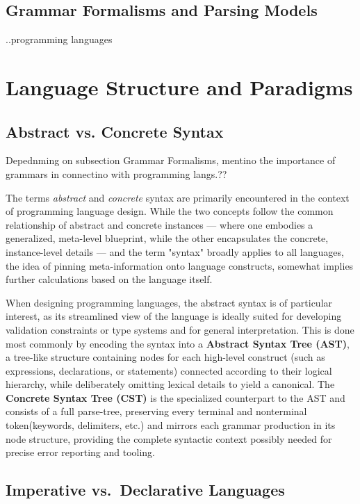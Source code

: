 \documentclass[11pt]{report}
\begin{document}
\subsection{Grammar Formalisms and Parsing Models}
..programming languages

\section{Language Structure and Paradigms}
\subsection{Abstract vs. Concrete Syntax}
Depednming on subsection Grammar Formalisms, mentino the importance of grammars in connectino with programming langs.??

The terms \textit{abstract} and \textit{concrete} syntax are primarily encountered in the context of programming language design. While the two concepts follow the common relationship of
abstract and concrete instances — where one embodies a generalized, meta-level blueprint, while the other encapsulates the concrete, instance-level details — and the term "syntax" broadly applies to all languages,
the idea of pinning meta-information onto language constructs, somewhat implies further calculations based on the language itself.


When designing programming languages, the abstract syntax is of particular interest, as its streamlined view of the language is ideally suited for developing 
validation constraints or type systems and for general interpretation. This is done most commonly by encoding the syntax into a \textbf{Abstract Syntax Tree (AST)}, 
a tree-like structure containing nodes for each high-level construct (such as expressions, declarations, or statements) connected according to their logical hierarchy, 
while deliberately omitting lexical details to yield a canonical. \cite{slonneger1995specifying}
The \textbf{Concrete Syntax Tree (CST)} is the specialized counterpart to the AST and consists of a full parse-tree, preserving every terminal and nonterminal 
token(keywords, delimiters, etc.) and mirrors each grammar production in its node structure, providing the complete syntactic context possibly needed for precise error 
reporting and tooling. \cite{aho2006compilers}

\subsection{Imperative vs.\ Declarative Languages}
\end{document}
